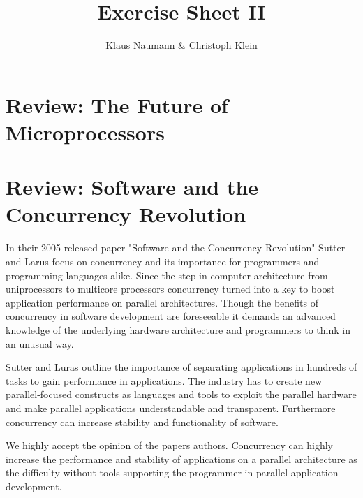 \documentclass[DIV=12,oneside,a4paper]{scrartcl}
\begin{document}

\title{Exercise Sheet II}
\subject{Advanced Parallel Computing}
\author{Klaus Naumann \& Christoph Klein}
\maketitle




\section{Review: The Future of Microprocessors}

\section{Review: Software and the Concurrency Revolution}
In their 2005 released paper "Software and the Concurrency Revolution" Sutter 
and Larus focus on concurrency and its importance for programmers and 
programming languages alike. Since the step in computer architecture from 
uniprocessors to multicore processors concurrency turned into a key to boost 
application performance on parallel architectures. Though the benefits of 
concurrency in software development are foreseeable it demands an advanced 
knowledge of the underlying hardware architecture and programmers to think in 
an unusual way.

Sutter and Luras outline the importance of separating applications in hundreds 
of tasks to gain performance in applications. The industry has to create new 
parallel-focused constructs as languages and tools to exploit the parallel 
hardware and make parallel applications understandable and transparent. 
Furthermore concurrency can increase stability and functionality of software.

We highly accept the opinion of the papers authors. Concurrency can highly 
increase the performance and stability of applications on a parallel architecture
as the difficulty without tools supporting the programmer in parallel application 
development.
      
\end{document}
